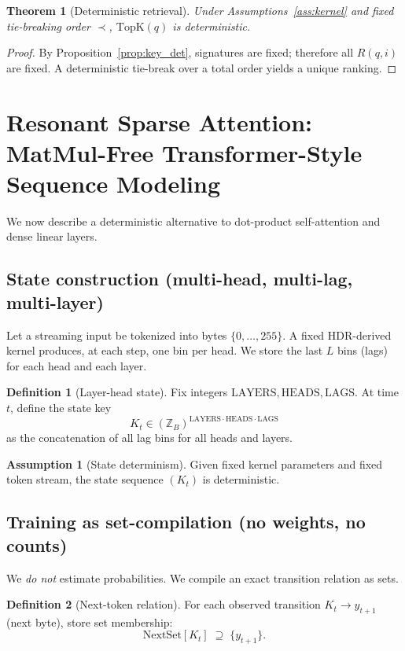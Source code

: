 \documentclass[11pt,a4paper]{article}
\theoremstyle{definition}
\newtheorem{definition}{Definition}[section]
\newtheorem{assumption}{Assumption}[section]
\theoremstyle{plain}
\newtheorem{theorem}{Theorem}[section]
\theoremstyle{remark}
\begin{document}
\begin{theorem}[Deterministic retrieval]\label{thm:retrieval_det}
Under Assumptions~\ref{ass:kernel} and fixed tie-breaking order $\prec$, $\mathrm{TopK}(q)$ is deterministic.
\end{theorem}
\begin{proof}
By Proposition~\ref{prop:key_det}, signatures are fixed; therefore all $R(q,i)$ are fixed.
A deterministic tie-break over a total order yields a unique ranking.
\end{proof}

\section{Resonant Sparse Attention: MatMul-Free Transformer-Style Sequence Modeling}
We now describe a deterministic alternative to dot-product self-attention and dense linear layers.

\subsection{State construction (multi-head, multi-lag, multi-layer)}
Let a streaming input be tokenized into bytes $\{0,\dots,255\}$.
A fixed HDR-derived kernel produces, at each step, one bin per head.
We store the last $L$ bins (lags) for each head and each layer.

\begin{definition}[Layer-head state]
Fix integers $\mathrm{LAYERS},\mathrm{HEADS},\mathrm{LAGS}$.
At time $t$, define the state key
\[
K_t \in (\mathbb{Z}_B)^{\mathrm{LAYERS}\cdot\mathrm{HEADS}\cdot\mathrm{LAGS}}
\]
as the concatenation of all lag bins for all heads and layers.
\end{definition}

\begin{assumption}[State determinism]\label{ass:state_det}
Given fixed kernel parameters and fixed token stream, the state sequence $(K_t)$ is deterministic.
\end{assumption}

\subsection{Training as set-compilation (no weights, no counts)}
We \emph{do not} estimate probabilities. We compile an exact transition relation as sets.

\begin{definition}[Next-token relation]
For each observed transition $K_t \to y_{t+1}$ (next byte),
store set membership:
\[
\mathrm{NextSet}[K_t] \;\supseteq\; \{y_{t+1}\}.
\]
\end{definition}
\end{document}
